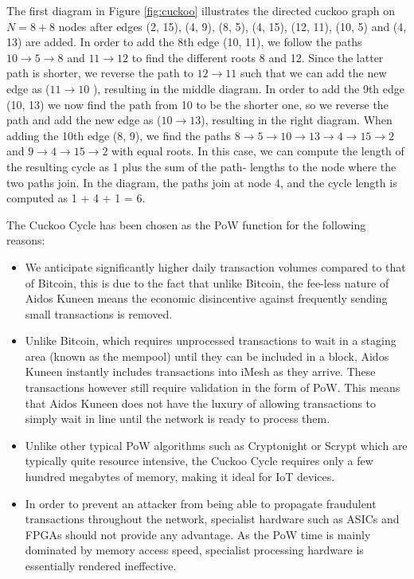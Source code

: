 \documentclass[a4paper,10pt,twocolumn]{article}
\begin{document}
The first diagram in Figure \ref{fig:cuckoo} illustrates the directed cuckoo graph on \( N = 8 + 8 \) nodes after edges (2, 15), (4, 
9), (8, 5), (4, 15), (12, 11), (10, 5) and (4, 13) are added. In order to add the 8th edge (10, 11), we follow the paths \( 10 
\rightarrow 5 \rightarrow 8 \) and \( 11 \rightarrow 12 \) to find the different roots 8 and 12. Since the latter path is shorter, we 
reverse the path to \( 12 \rightarrow 11\) such that we can add the new edge as (\( 11 \rightarrow 10\) ), resulting in the middle 
diagram. In order to add the 9th edge (10, 13) we now find the path from 10 to be the shorter one, so we reverse the path and add the 
new edge as (\( 10 \rightarrow 13\)), resulting in the right diagram. When adding the 10th edge (8, 9), we find the paths
 \( 8 \rightarrow 5 \rightarrow 10 \rightarrow 13 \rightarrow 4  \rightarrow 15 \rightarrow 2 \) and \( 9 \rightarrow 4 \rightarrow 15 
 \rightarrow 2 \)  with equal roots. In this case, we can compute the length of the resulting cycle as 1 plus the sum of the path-
 lengths to the node where the two paths join. In the diagram, the paths join at node 4, and the cycle length is computed as 1 + 4 + 1 
 = 6.

The Cuckoo Cycle has been chosen as the PoW function for the following reasons:

\begin{itemize}
\item We anticipate significantly higher daily transaction volumes compared to that of Bitcoin, this is due to the fact that unlike Bitcoin, the fee-less nature of Aidos Kuneen means the economic disincentive against frequently sending small transactions is removed. 

\item Unlike Bitcoin, which requires unprocessed transactions to wait in a staging area (known as the mempool) until they can be included in a block, Aidos Kuneen instantly includes transactions into iMesh as they arrive. These transactions however still require validation in the form of PoW. This means that Aidos Kuneen does not have the luxury of allowing transactions to simply wait in line until the network is ready to process them.

\item Unlike other typical PoW algorithms such as Cryptonight or Scrypt which are typically quite resource intensive, the Cuckoo Cycle requires only a few hundred megabytes of memory, making it ideal for IoT devices.

\item In order to prevent an attacker from being able to propagate fraudulent transactions throughout the network, specialist hardware such as ASICs and FPGAs should not provide any advantage. As the PoW time is mainly dominated by memory access speed, specialist processing hardware is essentially rendered ineffective.
\end{itemize}
\end{document}
